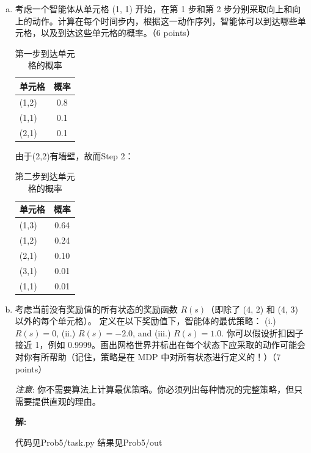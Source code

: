 \documentclass[8pt]{article}
\begin{document}
\begin{enumerate}[(a)]
\item 
考虑一个智能体从单元格 (1, 1) 开始，在第 1 步和第 2 步分别采取向上和向上的动作。计算在每个时间步内，根据这一动作序列，智能体可以到达哪些单元格，以及到达这些单元格的概率。（6 points）

\begin{table}[H]
    \centering
    \begin{tabular}{|l|c|}
    \hline
       单元格 &  概率\\
    \hline
       (1,2) & 0.8 \\
    \hline
        (1,1) & 0.1 \\
    \hline
        (2,1) & 0.1 \\
    \hline
    \end{tabular}
    \caption{第一步到达单元格的概率}
    \label{tab:first step Prob}
\end{table}

由于(2,2)有墙壁，故而Step 2：
\begin{table}[H]
    \centering
    \begin{tabular}{|l|c|}
    \hline
       单元格 &  概率\\
    \hline
       (1,3) & 0.64 \\
    \hline
        (1,2) & 0.24 \\
    \hline
        (2,1) & 0.10 \\
    \hline
        (3,1) & 0.01 \\
    \hline
        (1,1) & 0.01 \\
    \hline
    \end{tabular}
    \caption{第二步到达单元格的概率}
    \label{tab:second step Prob}
\end{table}

\vspace{1em}

\item
考虑当前没有奖励值的所有状态的奖励函数 $R(s)$（即除了 (4, 2) 和 (4, 3) 以外的每个单元格）。 定义在以下奖励值下，智能体的最优策略： (i.) $R(s) = 0$, (ii.) $R(s) = -2.0$, and (iii.) $R(s) = 1.0$. 你可以假设折扣因子接近 1，例如 0.9999。画出网格世界并标出在每个状态下应采取的动作可能会对你有所帮助（记住，策略是在 MDP 中对所有状态进行定义的！）（7 points）

\emph{注意}: 你不需要算法上计算最优策略。你必须列出每种情况的完整策略，但只需要提供直观的理由。
        
\textbf{\large 解:}

{\color{red}代码见Prob5/task.py 结果见Prob5/out}


\end{enumerate}
\end{document}
